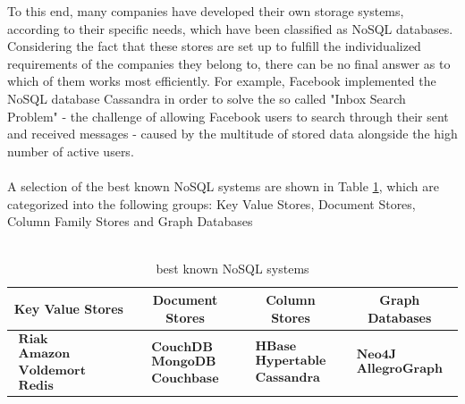 To this end, many companies have developed their own storage systems, according to their specific needs, which have been classified as \ac{NoSQL} databases. Considering the fact that these stores are set up to fulfill the individualized requirements of the companies they belong to, there can be no final answer as to which of them  works most efficiently. For example, Facebook implemented the \ac{NoSQL} database Cassandra in order to solve the so called "Inbox Search Problem" - the challenge of allowing Facebook users to search through their sent and received messages - caused by the multitude of stored data alongside the high number of active users. 
\\
\\
A selection of the best known \ac{NoSQL} systems are shown in Table \ref{tbl:nosql_sys}, which are categorized into the following groups: Key Value Stores, Document Stores, Column Family Stores and  Graph Databases
\\
\\
\begin{table}[htb]
\begin{tabular}{|c|c|c|c|}
\hline 
\textbf{Key Value Stores} & \textbf{Document Stores} & \textbf{Column Stores} & \textbf{Graph Databases} \\ 
\hline 
$\begin{array}{l} \textbf{Riak} \\ \textbf{Amazon SimpleDB} \\ \textbf{Voldemort}\\  \textbf{Redis} \end{array}$ & 
$\begin{array}{l} \textbf{CouchDB} \\ \textbf{MongoDB} \\ \textbf{Couchbase} \end{array}$ & 
$\begin{array}{l} \textbf{HBase} \\ \textbf{Hypertable} \\ \textbf{Cassandra}  \end{array}$  & 
$\begin{array}{l} \textbf{Neo4J} \\ \textbf{AllegroGraph}   \end{array}$ \\ 
\hline 
\end{tabular}
\caption{best known \ac{NoSQL} systems}
\label{tbl:nosql_sys}
\end{table}
\\
\\

